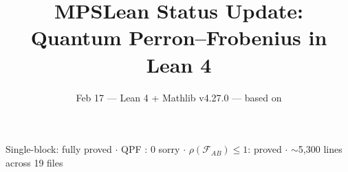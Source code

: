 \documentclass[aspectratio=169,10pt]{beamer}
\title{\textbf{MPSLean Status Update:\\Quantum Perron--Frobenius in Lean 4}}
\subtitle{{\small Feb 17 --- Lean 4 + Mathlib v4.27.0 --- based on \cite{Perez-Garcia2007Matrix,Wolf2012Quantum}}}
\date{}
\author{}
\begin{document}
{%
\begin{frame}
    \vspace{-1.5em}
    \maketitle
    \vspace{-3em}
    \begin{center}
        {\footnotesize
            \textcolor{dimwhite}{Single-block: \textcolor{leangreen}{fully proved} $\cdot$
            QPF \cite{Evans1978Spectral}: \textcolor{leangreen}{0 sorry} $\cdot$
            $\rho(\mathcal{F}_{AB}) \leq 1$: \textcolor{leangreen}{proved} $\cdot$
            ${\sim}$5{,}300 lines across 19 files}}
    \end{center}
\end{frame}
}
\end{document}
